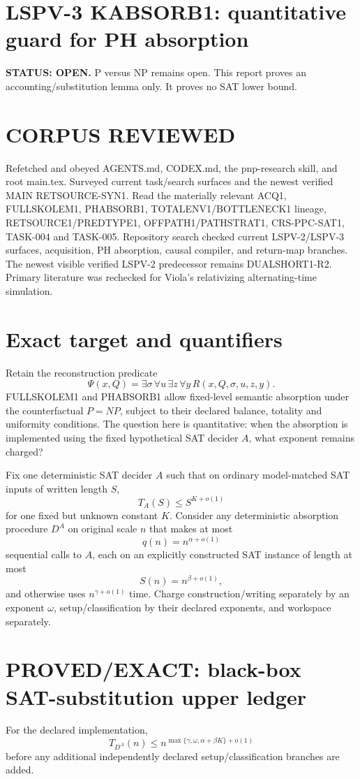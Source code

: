 \documentclass[11pt]{article}
\begin{document}
\section*{LSPV-3 KABSORB1: quantitative guard for PH absorption}
\textbf{STATUS: OPEN.} P versus NP remains open. This report proves an accounting/substitution lemma only. It proves no SAT lower bound.

\section*{CORPUS REVIEWED}
Refetched and obeyed AGENTS.md, CODEX.md, the pnp-research skill, and root main.tex. Surveyed current task/search surfaces and the newest verified MAIN RETSOURCE-SYN1. Read the materially relevant ACQ1, FULLSKOLEM1, PHABSORB1, TOTALENV1/BOTTLENECK1 lineage, RETSOURCE1/PREDTYPE1, OFFPATH1/PATHSTRAT1, CRS-PPC-SAT1, TASK-004 and TASK-005. Repository search checked current LSPV-2/LSPV-3 surfaces, acquisition, PH absorption, causal compiler, and return-map branches. The newest visible verified LSPV-2 predecessor remains DUALSHORT1-R2. Primary literature was rechecked for Viola's relativizing alternating-time simulation.

\section*{Exact target and quantifiers}
Retain the reconstruction predicate
\[
\Psi(x,Q)=\exists\sigma\,\forall u\,\exists z\,\forall y\,R(x,Q,\sigma,u,z,y).
\]
FULLSKOLEM1 and PHABSORB1 allow fixed-level semantic absorption under the counterfactual \(P=NP\), subject to their declared balance, totality and uniformity conditions. The question here is quantitative: when the absorption is implemented using the fixed hypothetical SAT decider \(A\), what exponent remains charged?

Fix one deterministic SAT decider \(A\) such that on ordinary model-matched SAT inputs of written length \(S\),
\[
T_A(S)\le S^{K+o(1)}
\]
for one fixed but unknown constant \(K\). Consider any deterministic absorption procedure \(D^A\) on original scale \(n\) that makes at most
\[
q(n)=n^{\alpha+o(1)}
\]
sequential calls to \(A\), each on an explicitly constructed SAT instance of length at most
\[
S(n)=n^{\beta+o(1)},
\]
and otherwise uses \(n^{\gamma+o(1)}\) time. Charge construction/writing separately by an exponent \(\omega\), setup/classification by their declared exponents, and workspace separately.

\section*{PROVED/EXACT: black-box SAT-substitution upper ledger}
For the declared implementation,
\[
T_{D^A}(n)
\le
n^{\max\{\gamma,\omega,\alpha+\beta K\}+o(1)}
\]
before any additional independently declared setup/classification branches are added.
\end{document}
